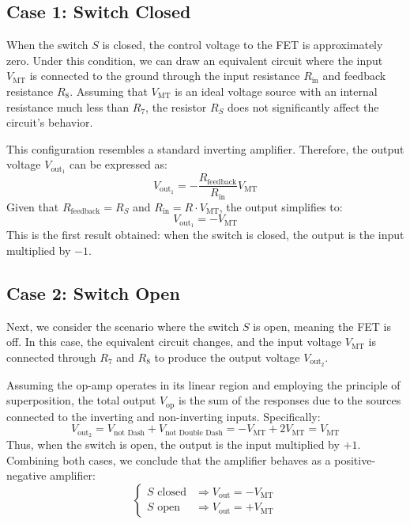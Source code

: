 \subsection*{Case 1: Switch Closed}
When the switch \( S \) is closed, the control voltage to the FET is approximately zero. Under this condition, we can draw an equivalent circuit where the input \( V_{\text{MT}} \) is connected to the ground through the input resistance \( R_{\text{in}} \) and feedback resistance \( R_8 \). Assuming that \( V_{\text{MT}} \) is an ideal voltage source with an internal resistance much less than \( R_7 \), the resistor \( R_S \) does not significantly affect the circuit's behavior.

This configuration resembles a standard inverting amplifier. Therefore, the output voltage \( V_{\text{out}_1} \) can be expressed as:
\[
V_{\text{out}_1} = -\frac{R_{\text{feedback}}}{R_{\text{in}}} V_{\text{MT}}
\]
Given that \( R_{\text{feedback}} = R_S \) and \( R_{\text{in}} = R \cdot V_{\text{MT}} \), the output simplifies to:
\[
V_{\text{out}_1} = -V_{\text{MT}}
\]
This is the first result obtained: when the switch is closed, the output is the input multiplied by \(-1\).

\subsection*{Case 2: Switch Open}
Next, we consider the scenario where the switch \( S \) is open, meaning the FET is off. In this case, the equivalent circuit changes, and the input voltage \( V_{\text{MT}} \) is connected through \( R_7 \) and \( R_8 \) to produce the output voltage \( V_{\text{out}_2} \).

Assuming the op-amp operates in its linear region and employing the principle of superposition, the total output \( V_{\text{op}} \) is the sum of the responses due to the sources connected to the inverting and non-inverting inputs. Specifically:
\[
V_{\text{out}_2} = V_{\text{not Dash}} + V_{\text{not Double Dash}} = -V_{\text{MT}} + 2V_{\text{MT}} = V_{\text{MT}}
\]
Thus, when the switch is open, the output is the input multiplied by \( +1 \). Combining both cases, we conclude that the amplifier behaves as a positive-negative amplifier:
\[
\begin{cases}
S \text{ closed} & \Rightarrow V_{\text{out}} = -V_{\text{MT}} \\
S \text{ open}   & \Rightarrow V_{\text{out}} = +V_{\text{MT}}
\end{cases}
\]

